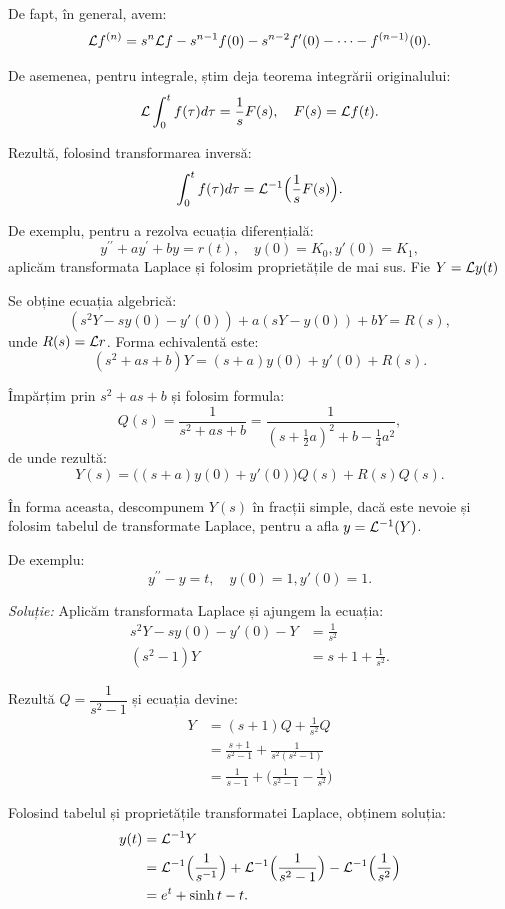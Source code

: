 De fapt, în general, avem:
\[
  \mathcal{L} f^{(n)} = s^n \mathcal{L} f - s^{n-1} f(0) - s^{n-2} f'(0) - \dots - f^{(n-1)}(0).
\]

De asemenea, pentru integrale, știm deja teorema integrării originalului:
\[
  \mathcal{L} \int_0^t f(\tau) d\tau = \dfrac{1}{s} F(s), \quad F(s) = \mathcal{L} f(t).
\]

Rezultă, folosind transformarea inversă:
\[
  \int_0^t f(\tau) d\tau = \mathcal{L}^{-1} \Big( \dfrac{1}{s} F(s) \Big).
\]

De exemplu, pentru a rezolva ecuația diferențială:
\[
  y^{\prime \prime} + ay^\prime + by = r(t), \quad y(0) = K_0, y'(0) = K_1,
\]
aplicăm transformata Laplace și folosim proprietățile de mai sus. Fie $ Y = \mathcal{L} y(t) $

Se obține ecuația algebrică:
\[
  (s^2 Y - sy(0) - y'(0)) + a(sY - y(0)) + bY = R(s),
\]
unde $ R(s) = \mathcal{L} r $. Forma echivalentă este:
\[
  (s^2 + as + b) Y = (s + a)y(0) + y'(0) + R(s).
\]

Împărțim prin $ s^2 + as + b $ și folosim formula:
\[
  Q(s) = \frac{1}{s^2 + as + b} =
  \frac{1}{(s + \frac{1}{2}a)^2 + b - \frac{1}{4}a^2},
\]
de unde rezultă:
\[
  Y(s) = \big( (s + a) y(0) + y'(0)\big) Q(s) + R(s) Q(s).
\]

În forma aceasta, descompunem $ Y(s) $ în fracții simple, dacă este nevoie și
folosim tabelul de transformate Laplace, pentru a afla $ y = \mathcal{L}^{-1}(Y) $.

\vspace{1cm}

De exemplu:
\[
  y^{\prime\prime} - y = t, \quad y(0) = 1, y'(0) = 1.
\]

\emph{Soluție:} Aplicăm transformata Laplace și ajungem la ecuația:
\begin{align*}
  s^2 Y - sy(0) - y'(0) - Y &= \frac{1}{s^2} \\
  (s^2 - 1)Y &= s + 1 + \frac{1}{s^2}.
\end{align*}

Rezultă $ Q = \dfrac{1}{s^2 - 1} $ și ecuația devine:
\begin{align*}
  Y &= (s + 1)Q + \frac{1}{s^2} Q \\
    &= \frac{s + 1}{s^2 - 1} + \frac{1}{s^2(s^2 - 1)} \\
    &= \frac{1}{s - 1} + \Big( \frac{1}{s^2 - 1} - \frac{1}{s^2} \Big)
\end{align*}

Folosind tabelul și proprietățile transformatei Laplace, obținem soluția:
\begin{align*}
  y(t) &= \Lap^{-1} Y \\
       &= \Lap^{-1} \Big( \frac{1}{s^{-1}} \Big) + \Lap^{-1} \Big( \frac{1}{s^2 - 1} \Big) - %
         \Lap^{-1} \Big( \frac{1}{s^2} \Big) \\
       &= e^t + \sinh t - t.
\end{align*}

